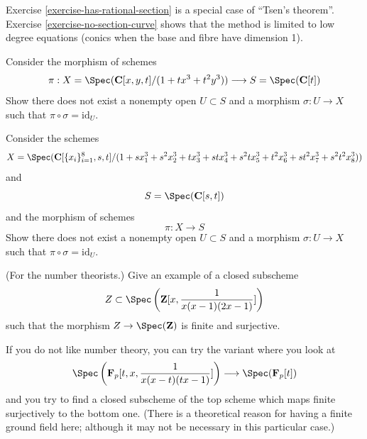 \begin{remark}
\label{remark-tsen}
Exercise \ref{exercise-has-rational-section}
is a special case of ``Tsen's theorem''.
Exercise \ref{exercise-no-section-curve} shows that the
method is limited to low degree equations (conics when the base and
fibre have dimension 1).
\end{remark}

\begin{exercise}
\label{exercise-no-section-curve}
Consider the morphism of schemes
$$
\pi :
X = \Spec(\mathbf{C}[x, y, t]
/(1 + t x^3 + t^2 y^3))
\longrightarrow
S = \Spec(\mathbf{C}[t])
$$
Show there does not exist a nonempty open $U \subset S$ and
a morphism $\sigma : U \to X$ such that $\pi \circ \sigma = \text{id}_U$.
\end{exercise}

\begin{exercise}
\label{exercise-no-section-surface}
Consider the schemes
$$
X = \Spec(\mathbf{C}[\{x_i\}_{i = 1}^{8}, s, t]
/(1 + s x_1^3 + s^2 x_2^3 +
t x_3^3 + st x_4^3 + s^2t x_5^3 +
t^2 x_6^3 + st^2 x_7^3 + s^2t^2 x_8^3))
$$
and
$$
S = \Spec(\mathbf{C}[s, t])
$$
and the morphism of schemes
$$
\pi : X \longrightarrow S
$$
Show there does not exist a nonempty open $U \subset S$ and
a morphism $\sigma : U \to X$ such that $\pi \circ \sigma = \text{id}_U$.
\end{exercise}

\begin{exercise}
\label{exercise-for-number-theorists}
(For the number theorists.) Give an example of a closed subscheme
$$
Z \subset \Spec\left({\mathbf Z}[x, \frac{1 }{ x(x-1)(2x-1)}]\right)
$$
such that the morphism $Z \to \Spec({\mathbf Z})$ is finite
and surjective.
\end{exercise}

\begin{exercise}
\label{exercise-quasi-section}
If you do not like number theory, you can try the
variant where you look at
$$
\Spec\left({\mathbf F}_p[t, x, \frac{1 }{ x(x-t)(tx-1)}]\right)
\longrightarrow
\Spec({\mathbf F}_p[t])
$$
and you try to find a closed subscheme of the top scheme
which maps finite surjectively to the bottom one. (There is a
theoretical reason for having a finite ground field here; although
it may not be necessary in this particular case.)
\end{exercise}

